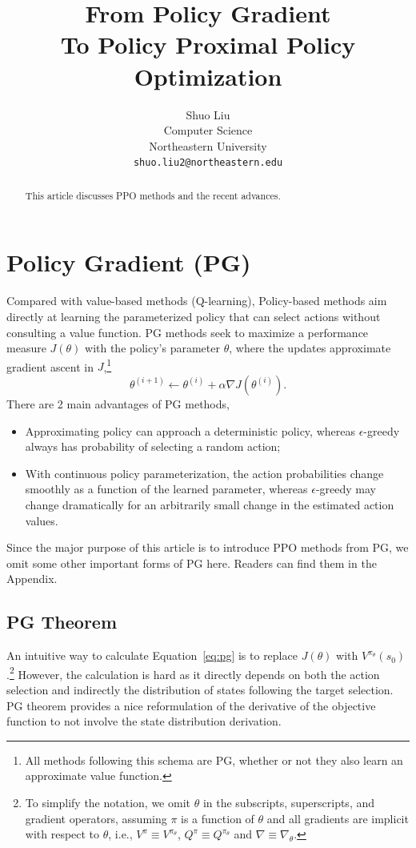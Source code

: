\documentclass{article} %
\title{From Policy Gradient \\To Policy Proximal Policy Optimization}
\author{Shuo Liu \\
Computer Science\\
Northeastern University\\
\texttt{shuo.liu2@northeastern.edu} \\
}
\begin{document}
\maketitle

\begin{abstract}
This article discusses PPO methods and the recent advances. 
\end{abstract}

\section{Policy Gradient (PG)}

Compared with value-based methods (Q-learning), Policy-based methods aim directly at learning the parameterized policy that can select actions without consulting a value function. PG methods seek to maximize a performance measure $J(\theta)$ with the policy's parameter $\theta$, where the updates approximate gradient ascent in $J$,\footnote{All methods following this schema are PG, whether or not they also learn an approximate value function.}
\begin{equation} \label{eq:pg}
    \theta^{(i+1)} \leftarrow \theta^{(i)} + \alpha\nabla J(\theta^{(i)}).
\end{equation}
There are 2 main advantages of PG methods,
\begin{itemize}
    \item Approximating policy can approach a deterministic policy, whereas $\epsilon$-greedy always has probability of selecting a random action;
    \item With continuous policy parameterization, the action probabilities change smoothly as a function of the learned parameter, whereas $\epsilon$-greedy may change dramatically for an arbitrarily small change in the estimated action values.
\end{itemize}

Since the major purpose of this article is to introduce PPO methods from PG, we omit some other important forms of PG here. Readers can find them in the Appendix.

\subsection{PG Theorem}

An intuitive way to calculate Equation~\ref{eq:pg} is to replace $J(\theta)$ with $V^{\pi_{\theta}} (s_0)$.\footnote{To simplify the notation, we omit $\theta$ in the subscripts, superscripts, and gradient operators, assuming $\pi$ is a function of $\theta$ and all gradients are implicit with respect to $\theta$, i.e., $V^{\pi}\equiv V^{\pi_{\theta}}$, $Q^{\pi}\equiv Q^{\pi_{\theta}}$ and $\nabla\equiv\nabla_{\theta}$.} However, the calculation is hard as it directly depends on both the action selection and indirectly the distribution of states following the target selection. PG theorem provides a nice reformulation of the derivative of the objective function to not involve the state distribution derivation.
\end{document}
